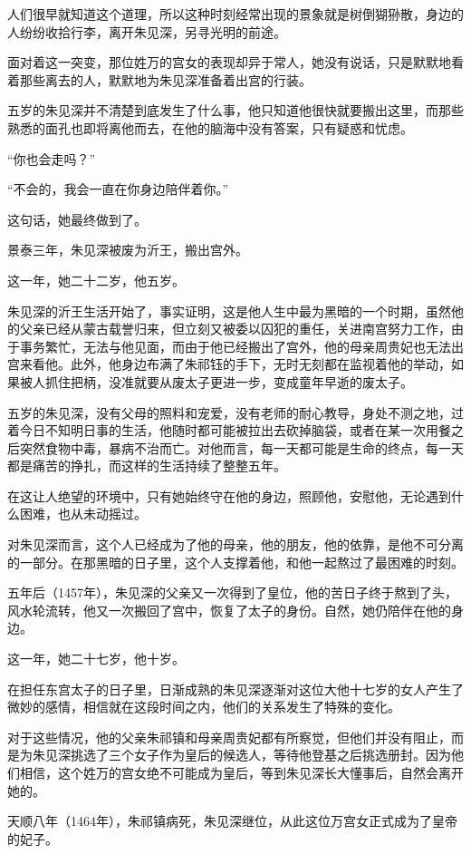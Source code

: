 \begin{multicols}{\theparacolNo}
人们很早就知道这个道理，所以这种时刻经常出现的景象就是树倒猢狲散，身边的人纷纷收拾行李，离开朱见深，另寻光明的前途。

面对着这一突变，那位姓万的宫女的表现却异于常人，她没有说话，只是默默地看着那些离去的人，默默地为朱见深准备着出宫的行装。

五岁的朱见深并不清楚到底发生了什么事，他只知道他很快就要搬出这里，而那些熟悉的面孔也即将离他而去，在他的脑海中没有答案，只有疑惑和忧虑。

“你也会走吗？”

“不会的，我会一直在你身边陪伴着你。”

这句话，她最终做到了。

景泰三年，朱见深被废为沂王，搬出宫外。

这一年，她二十二岁，他五岁。

朱见深的沂王生活开始了，事实证明，这是他人生中最为黑暗的一个时期，虽然他的父亲已经从蒙古载誉归来，但立刻又被委以囚犯的重任，关进南宫努力工作，由于事务繁忙，无法与他见面，而由于他已经搬出了宫外，他的母亲周贵妃也无法出宫来看他。此外，他身边布满了朱祁钰的手下，无时无刻都在监视着他的举动，如果被人抓住把柄，没准就要从废太子更进一步，变成童年早逝的废太子。

五岁的朱见深，没有父母的照料和宠爱，没有老师的耐心教导，身处不测之地，过着今日不知明日事的生活，他随时都可能被拉出去砍掉脑袋，或者在某一次用餐之后突然食物中毒，暴病不治而亡。对他而言，每一天都可能是生命的终点，每一天都是痛苦的挣扎，而这样的生活持续了整整五年。

在这让人绝望的环境中，只有她始终守在他的身边，照顾他，安慰他，无论遇到什么困难，也从未动摇过。

对朱见深而言，这个人已经成为了他的母亲，他的朋友，他的依靠，是他不可分离的一部分。在那黑暗的日子里，这个人支撑着他，和他一起熬过了最困难的时刻。

五年后（1457年），朱见深的父亲又一次得到了皇位，他的苦日子终于熬到了头，风水轮流转，他又一次搬回了宫中，恢复了太子的身份。自然，她仍陪伴在他的身边。

这一年，她二十七岁，他十岁。

在担任东宫太子的日子里，日渐成熟的朱见深逐渐对这位大他十七岁的女人产生了微妙的感情，相信就在这段时间之内，他们的关系发生了特殊的变化。

对于这些情况，他的父亲朱祁镇和母亲周贵妃都有所察觉，但他们并没有阻止，而是为朱见深挑选了三个女子作为皇后的候选人，等待他登基之后挑选册封。因为他们相信，这个姓万的宫女绝不可能成为皇后，等到朱见深长大懂事后，自然会离开她的。

天顺八年（1464年），朱祁镇病死，朱见深继位，从此这位万宫女正式成为了皇帝的妃子。


\end{multicols}
